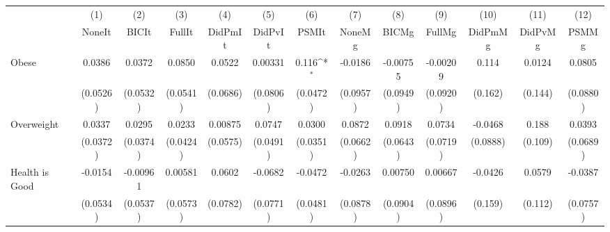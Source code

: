 {
\def\sym#1{\ifmmode^{#1}\else\(^{#1}\)\fi}
\begin{tabular}{l*{12}{c}}
\toprule
            &\multicolumn{1}{c}{(1)}&\multicolumn{1}{c}{(2)}&\multicolumn{1}{c}{(3)}&\multicolumn{1}{c}{(4)}&\multicolumn{1}{c}{(5)}&\multicolumn{1}{c}{(6)}&\multicolumn{1}{c}{(7)}&\multicolumn{1}{c}{(8)}&\multicolumn{1}{c}{(9)}&\multicolumn{1}{c}{(10)}&\multicolumn{1}{c}{(11)}&\multicolumn{1}{c}{(12)}\\
            &\multicolumn{1}{c}{NoneIt}&\multicolumn{1}{c}{BICIt}&\multicolumn{1}{c}{FullIt}&\multicolumn{1}{c}{DidPmIt}&\multicolumn{1}{c}{DidPvIt}&\multicolumn{1}{c}{PSMIt}&\multicolumn{1}{c}{NoneMg}&\multicolumn{1}{c}{BICMg}&\multicolumn{1}{c}{FullMg}&\multicolumn{1}{c}{DidPmMg}&\multicolumn{1}{c}{DidPvMg}&\multicolumn{1}{c}{PSMMg}\\
\midrule
Obese       &      0.0386         &      0.0372         &      0.0850         &      0.0522         &     0.00331         &       0.116\sym{*}  &     -0.0186         &    -0.00755         &    -0.00209         &       0.114         &      0.0124         &      0.0805         \\
            &    (0.0526)         &    (0.0532)         &    (0.0541)         &    (0.0686)         &    (0.0806)         &    (0.0472)         &    (0.0957)         &    (0.0949)         &    (0.0920)         &     (0.162)         &     (0.144)         &    (0.0880)         \\
\addlinespace
Overweight  &      0.0337         &      0.0295         &      0.0233         &     0.00875         &      0.0747         &      0.0300         &      0.0872         &      0.0918         &      0.0734         &     -0.0468         &       0.188         &      0.0393         \\
            &    (0.0372)         &    (0.0374)         &    (0.0424)         &    (0.0575)         &    (0.0491)         &    (0.0351)         &    (0.0662)         &    (0.0643)         &    (0.0719)         &    (0.0888)         &     (0.109)         &    (0.0689)         \\
\addlinespace
Health is Good&     -0.0154         &    -0.00961         &     0.00581         &      0.0602         &     -0.0682         &     -0.0472         &     -0.0263         &     0.00750         &     0.00667         &     -0.0426         &      0.0579         &     -0.0387         \\
            &    (0.0534)         &    (0.0537)         &    (0.0573)         &    (0.0782)         &    (0.0771)         &    (0.0481)         &    (0.0878)         &    (0.0904)         &    (0.0896)         &     (0.159)         &     (0.112)         &    (0.0757)         \\

\end{tabular}}
